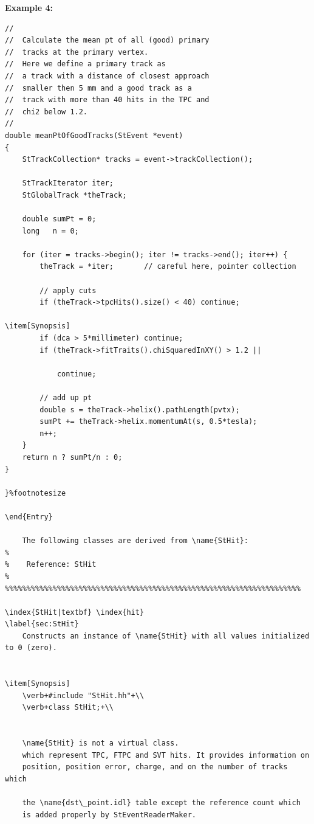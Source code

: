 \begin{enumerate}
\begin{Entry}
{\bf Example 4:}
{\footnotesize
\begin{verbatim}
//
//  Calculate the mean pt of all (good) primary
//  tracks at the primary vertex.
//  Here we define a primary track as
//  a track with a distance of closest approach
//  smaller then 5 mm and a good track as a
//  track with more than 40 hits in the TPC and
//  chi2 below 1.2.
//
double meanPtOfGoodTracks(StEvent *event)
{
    StTrackCollection* tracks = event->trackCollection();

    StTrackIterator iter;
    StGlobalTrack *theTrack;

    double sumPt = 0;
    long   n = 0;

    for (iter = tracks->begin(); iter != tracks->end(); iter++) {
        theTrack = *iter;       // careful here, pointer collection

        // apply cuts
        if (theTrack->tpcHits().size() < 40) continue;
    
\item[Synopsis] 
        if (dca > 5*millimeter) continue;
        if (theTrack->fitTraits().chiSquaredInXY() > 1.2 ||
    
            continue;

        // add up pt
        double s = theTrack->helix().pathLength(pvtx);
        sumPt += theTrack->helix.momentumAt(s, 0.5*tesla);
        n++;
    }
    return n ? sumPt/n : 0;
}
    
}%footnotesize

\end{Entry}

    The following classes are derived from \name{StHit}: 
%
%    Reference: StHit
%
%%%%%%%%%%%%%%%%%%%%%%%%%%%%%%%%%%%%%%%%%%%%%%%%%%%%%%%%%%%%%%%%%%%%

\index{StHit|textbf} \index{hit}
\label{sec:StHit}
    Constructs an instance of \name{StHit} with all values initialized to 0 (zero).
    

\item[Synopsis]
    \verb+#include "StHit.hh"+\\
    \verb+class StHit;+\\

        
    \name{StHit} is not a virtual class.
    which represent TPC, FTPC and SVT hits. It provides information on
    position, position error, charge, and on the number of tracks which
    
    the \name{dst\_point.idl} table except the reference count which
    is added properly by StEventReaderMaker.
    

\end{verbatim}}
\end{Entry}
\end{enumerate}

